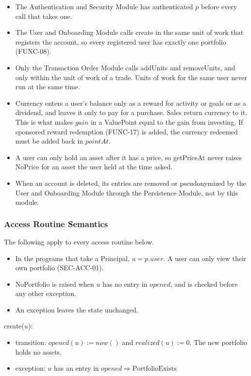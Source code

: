 \documentclass[12pt, titlepage]{article}
\begin{document}
\begin{itemize}
\item The Authentication and Security Module has authenticated $p$ before
  every call that takes one.
\item The User and Onboarding Module calls create in the same unit of work
  that registers the account, so every registered user has exactly one
  portfolio (FUNC-08).
\item Only the Transaction Order Module calls addUnits and removeUnits, and
  only within the unit of work of a trade. Units of work for the same user
  never run at the same time.
\item Currency enters a user's balance only as a reward for activity or
  goals or as a dividend, and leaves it only to pay for a purchase. Sales
  return currency to it. This is what makes $\mathit{gain}$ in a ValuePoint
  equal to the gain from investing. If sponsored reward redemption (FUNC-17)
  is added, the currency redeemed must be added back in
  $\mathit{pointAt}$.
\item A user can only hold an asset after it has a price, so getPriceAt
  never raises NoPrice for an asset the user held at the time asked.
\item When an account is deleted, its entries are removed or pseudonymized
  by the User and Onboarding Module through the Persistence Module, not by
  this module.
\end{itemize}

\subsubsection{Access Routine Semantics}

\noindent The following apply to every access routine below.

\begin{itemize}
\item In the programs that take a Principal, $u = p.\mathit{user}$. A user
  can only view their own portfolio (SEC-ACC-01).
\item NoPortfolio is raised when $u$ has no entry in $\mathit{opened}$, and
  is checked before any other exception.
\item An exception leaves the state unchanged.
\end{itemize}

\medskip

\noindent create($u$):
\begin{itemize}
\item transition: $\mathit{opened}(u) := \mathit{now}()$ and
  $\mathit{realized}(u) := 0$. The new portfolio holds no assets.
\item exception: $u$ has an entry in $\mathit{opened} \Rightarrow
  \mathrm{PortfolioExists}$
\end{itemize}
\end{document}
